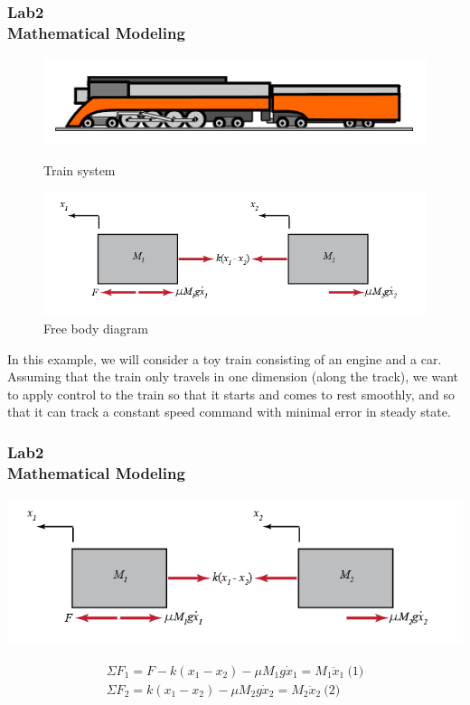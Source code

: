 \documentclass[hyperref={pdfpagelabels=true}]{beamer}
\begin{document}
\begin{frame}
\frametitle{Lab2 \\{\large Mathematical Modeling}}
\begin{figure}[!tbp]
  \begin{minipage}[t]{0.2\textwidth}
\includegraphics[scale = 0.28]{figs/Selection_037.png}
    \caption{Train system}
  \end{minipage}
  \hfill
  \begin{minipage}[t]{0.52\textwidth}
\includegraphics[scale = 0.25]{figs/Selection_038.png}
    \caption{Free body diagram}
  \end{minipage}
\end{figure}
In this example, we will consider a toy train consisting of an engine and a car. Assuming that the train only travels in one dimension (along the track), we want to apply control to the train so that it starts and comes to rest smoothly, and so that it can track a constant speed command with minimal error in steady state.
\end{frame}

\begin{frame}
\frametitle{Lab2 \\{\large Mathematical Modeling}}
\includegraphics[scale = 0.45]{figs/Selection_038.png}

\begin{align*}
 \Sigma F_1 = F - k(x_1 - x_2) - \mu M_1 g \dot{x}_1 = M_1 \ddot{x}_1 \  \text{(1)}\\
 \Sigma F_2 = k(x_1 - x_2) - \mu M_2 g \dot{x}_2 = M_2 \ddot{x}_2  \ \text{(2)}
\end{align*}
\end{frame}
\end{document}
